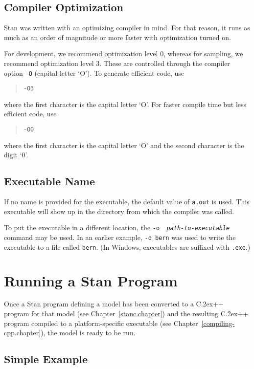 \documentclass[10pt]{report}
\newcommand{\Stan}{Stan\xspace}
\newcommand*{\Cpp}{C\raise.2ex\hbox{\footnotesize ++}\xspace} %
\newcommand{\code}[1]{{\tt #1}}
\newcommand{\refchapter}[1]{Chapter~\ref{#1.chapter}}
\begin{document}
\section{Compiler Optimization}

Stan was written with an optimizing compiler in mind.  For
that reason, it runs as much as an order of magnitude or more
faster with optimization turned on.  

For development, we recommend optimization level 0, whereas for
sampling, we recommend optimization level 3.  These are controlled
through the compiler option \code{-O} (capital letter `O').  To
generate efficient code, use
%
\begin{quote}
\code{-O3}
\end{quote}
%
where the first character is the capital letter `O'.
For faster compile time but less efficient code, use
%
\begin{quote}
\code{-O0}
\end{quote}
%
where the first character is the capital letter `O' and
the second character is the digit `0'.

\section{Executable Name}

If no name is provided for the executable, the default value of
\code{a.out} is used.  This executable will show up in the directory
from which the compiler was called.

To put the executable in a different location, the \code{-o {\slshape
    path-to-executable}} command may be used.  In an earlier example,
\code{-o bern} was used to write the executable to a file called
\code{bern}.  (In Windows, executables are suffixed with \code{.exe}.)



\chapter{Running a \Stan Program}\label{stan-cmd.chapter}

Once a \Stan program defining a model has been converted to a \Cpp
program for that model (see \refchapter{stanc}) and the resulting \Cpp
program compiled to a platform-specific executable (see
\refchapter{compiling-cpp}), the model is ready to be run.

\section{Simple Example}
\end{document}
